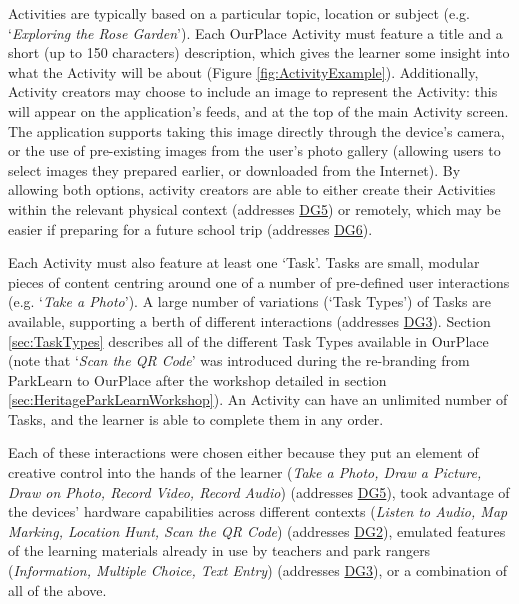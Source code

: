 Activities are typically based on a particular topic, location or subject (e.g. `\textit{Exploring the Rose Garden}'). Each OurPlace Activity must feature a title and a short (up to 150 characters) description, which gives the learner some insight into what the Activity will be about (Figure \ref{fig:ActivityExample}). Additionally, Activity creators may choose to include an image to represent the Activity: this will appear on the application's feeds, and at the top of the main Activity screen. The application supports taking this image directly through the device's camera, or the use of pre-existing images from the user's photo gallery (allowing users to select images they prepared earlier, or downloaded from the Internet). By allowing both options, activity creators are able to either create their Activities within the relevant physical context (addresses \hyperref[DG5]{DG5}) or remotely, which may be easier if preparing for a future school trip (addresses \hyperref[DG6]{DG6}).

Each Activity must also feature at least one `Task'. Tasks are small, modular pieces of content centring around one of a number of pre-defined user interactions (e.g. `\textit{Take a Photo}'). A large number of variations (`Task Types') of Tasks are available, supporting a berth of different interactions (addresses \hyperref[DG3]{DG3}). Section \ref{sec:TaskTypes} describes all of the different Task Types available in OurPlace (note that `\textit{Scan the QR Code}' was introduced during the re-branding from ParkLearn to OurPlace after the workshop detailed in section \ref{sec:HeritageParkLearnWorkshop}). An Activity can have an unlimited number of Tasks, and the learner is able to complete them in any order.

Each of these interactions were chosen either because they put an element of creative control into the hands of the learner (\textit{Take a Photo, Draw a Picture, Draw on Photo, Record Video, Record Audio}) (addresses \hyperref[DG5]{DG5}), took advantage of the devices’ hardware capabilities across different contexts (\textit{Listen to Audio, Map Marking, Location Hunt, Scan the QR Code}) (addresses \hyperref[DG2]{DG2}), emulated features of the learning materials already in use by teachers and park rangers (\textit{Information, Multiple Choice, Text Entry}) (addresses \hyperref[DG3]{DG3}), or a combination of all of the above.

